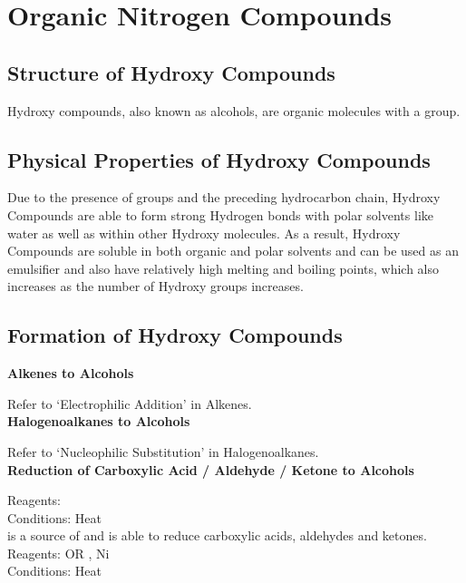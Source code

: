 \documentclass[../main]{subfiles}
\begin{document}
\section{Organic Nitrogen Compounds}

	\subsection{Structure of Hydroxy Compounds}

	Hydroxy compounds, also known as alcohols, are organic molecules with a  group. \\

	\subsection{Physical Properties of Hydroxy Compounds}

	Due to the presence of  groups and the preceding hydrocarbon chain, Hydroxy Compounds are able to form strong Hydrogen bonds with polar solvents like water as well as within other Hydroxy molecules. As a result, Hydroxy Compounds are soluble in both organic and polar solvents and can be used as an emulsifier and also have relatively high melting and boiling points, which also increases as the number of Hydroxy groups increases.

	\subsection{Formation of Hydroxy Compounds}

	\noindent \textbf{Alkenes to Alcohols}

	Refer to `Electrophilic Addition' in Alkenes. \\

	\noindent \textbf{Halogenoalkanes to Alcohols}

	Refer to `Nucleophilic Substitution' in Halogenoalkanes. \\

	\noindent \textbf{Reduction of Carboxylic Acid / Aldehyde / Ketone to Alcohols}

	Reagents: \\
	Conditions: Heat \\

	 is a source of  and is able to reduce carboxylic acids, aldehydes and ketones. \\

	Reagents:  OR , Ni \\
	Conditions: Heat \\
\end{document}
